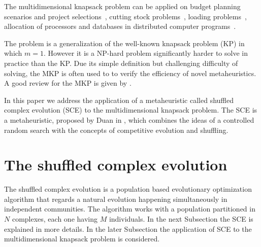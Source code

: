 \documentclass[a0,portrait]{a0poster}
\begin{document}
\begin{multicols}{2}
The multidimensional knapsack problem can be applied on budget planning 
scenarios and project selections~\cite{mcmillan1973resource},
cutting stock problems~\cite{Gilmore-Gomory-1966}, loading problems~\cite{Shih-1979},
allocation of processors and databases in distributed computer programs~\cite{Gavish-Pirckul-1982}.

The problem is a generalization of the well-known knapsack problem (KP) in which
$m = 1$.
However it is a NP-hard problem significantly harder to solve in practice than the KP.
Due its simple definition but challenging difficulty of solving, the MKP is often used to
to verify the efficiency of novel metaheuristics.
A good review for the MKP is given by \cite{freville1994efficient}.

In this paper we address the application of a metaheuristic called
shuffled complex evolution (SCE) to the multidimensional knapsack problem.
The SCE is a metaheuristic, proposed by Duan in \cite{duan1992effective},
which combines the ideas of a controlled random search with the concepts
of competitive evolution and shuffling.

\color{DarkSlateGray} %

\section*{The shuffled complex evolution}

The shuffled complex evolution is a population
based evolutionary optimization algorithm that regards a natural 
evolution happening simultaneously in independent communities.
The algorithm works with a population partitioned in $N$ complexes, each one
having $M$ individuals.
In the next Subsection the SCE is explained in more details.
In the later Subsection the application of SCE to the multidimensional knapsack
problem is considered.


\end{multicols}
\end{document}

